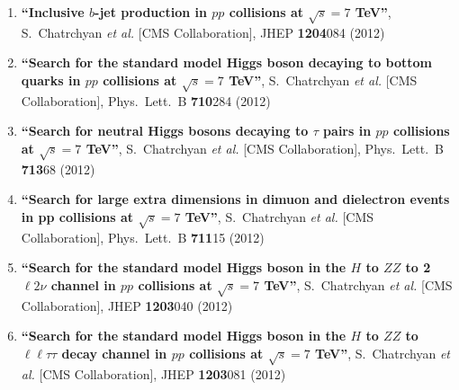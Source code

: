 \begin{enumerate}
\item%
{\bf ``Inclusive $b$-jet production in $pp$ collisions at $\sqrt{s}=7$ TeV''}, 
  S.~Chatrchyan {\it et al.}  [CMS Collaboration], 
JHEP {\bf 1204}084 (2012) %


\item%
{\bf ``Search for the standard model Higgs boson decaying to bottom quarks in $pp$ collisions at $\sqrt{s}=7$ TeV''}, 
  S.~Chatrchyan {\it et al.}  [CMS Collaboration], 
Phys.\ Lett.\ B {\bf 710}284 (2012) %


\item%
{\bf ``Search for neutral Higgs bosons decaying to $\tau$ pairs in $pp$ collisions at $\sqrt{s}=7$ TeV''}, 
  S.~Chatrchyan {\it et al.}  [CMS Collaboration], 
Phys.\ Lett.\ B {\bf 713}68 (2012) %


\item%
{\bf ``Search for large extra dimensions in dimuon and dielectron events in pp collisions at $\sqrt{s} = 7$ TeV''}, 
  S.~Chatrchyan {\it et al.}  [CMS Collaboration], 
Phys.\ Lett.\ B {\bf 711}15 (2012) %


\item%
{\bf ``Search for the standard model Higgs boson in the $H$ to $Z Z$ to 2 $\ell 2 \nu$ channel in $pp$ collisions at $\sqrt{s}=7$ TeV''}, 
  S.~Chatrchyan {\it et al.}  [CMS Collaboration], 
JHEP {\bf 1203}040 (2012) %


\item%
{\bf ``Search for the standard model Higgs boson in the $H$ to $Z Z$ to $\ell \ell \tau \tau$ decay channel in $pp$ collisions at $\sqrt{s}=7$ TeV''}, 
  S.~Chatrchyan {\it et al.}  [CMS Collaboration], 
JHEP {\bf 1203}081 (2012) %



\end{enumerate}
